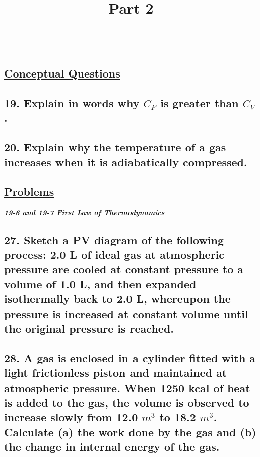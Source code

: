 \documentclass{article}
\title{
    \vspace{2in}
    \textmd{\textbf{\hmwkTitle}} \\
    \textmd{\textbf{Part 2}} \\
    \vspace{0.5in}
    \textmd{\textbf{\hmwkClass}}\\
    \vspace{4in}
}
\author{\hmwkAuthorName}
\date{}
\begin{document}
\maketitle
\clearpage\shipout\null
\begin{center}
    \section*{\textbf{\underline {Conceptual Questions}}}
\end{center}
    \subsection*{19. Explain in words why $C_P$ is greater than $C_V$.}
    \vspace{3in}
    \subsection*{20. Explain why the temperature of a gas increases when it is adiabatically compressed.}
\newpage
\clearpage\shipout\null
\begin{center}
    \section*{\textbf{\underline {Problems}}}
\end{center}
\noindent \large{\textbf{\textit{\underline{19-6 and 19-7  First Law of Thermodynamics}}}} \\
    \subsection*{27. Sketch a PV diagram of the following process: 2.0 L of ideal gas at atmospheric pressure are cooled at constant pressure to a volume of 1.0 L, and then expanded isothermally back to 2.0 L, whereupon the pressure is increased at constant volume until the original pressure is reached.}
    \vspace{3in}
    \subsection*{28. A gas is enclosed in a cylinder fitted with a light frictionless piston and maintained at atmospheric pressure. When 1250 kcal of heat is added to the gas, the volume is observed to increase slowly from 12.0 $m^3$ to 18.2 $m^3$. Calculate (a) the work done by the gas and (b) the change in internal energy of the gas.}
    \newpage
\end{document}
